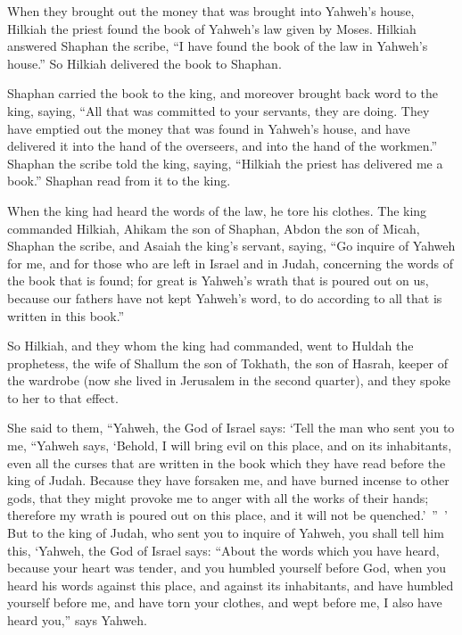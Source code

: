 {\par }{\PP {}When they brought out the money that was brought into Yahweh’s house, Hilkiah the priest found the book of Yahweh’s law given by Moses.
Hilkiah answered Shaphan the scribe, “I have found the book of the law in Yahweh’s house.” So Hilkiah delivered the book to Shaphan.
\par }{\PP {}Shaphan carried the book to the king, and moreover brought back word to the king, saying, “All that was committed to your servants, they are doing.
They have emptied out the money that was found in Yahweh’s house, and have delivered it into the hand of the overseers, and into the hand of the workmen.”
Shaphan the scribe told the king, saying, “Hilkiah the priest has delivered me a book.” Shaphan read from it to the king.
\par }{\PP {}When the king had heard the words of the law, he tore his clothes.
The king commanded Hilkiah, Ahikam the son of Shaphan, Abdon the son of Micah, Shaphan the scribe, and Asaiah the king’s servant, saying,
“Go inquire of Yahweh for me, and for those who are left in Israel and in Judah, concerning the words of the book that is found; for great is Yahweh’s wrath that is poured out on us, because our fathers have not kept Yahweh’s word, to do according to all that is written in this book.”
\par }{\PP {}So Hilkiah, and they whom the king had commanded, went to Huldah the prophetess, the wife of Shallum the son of Tokhath, the son of Hasrah, keeper of the wardrobe (now she lived in Jerusalem in the second quarter), and they spoke to her to that effect.
\par }{\PP {}She said to them, “Yahweh, the God of Israel says: ‘Tell the man who sent you to me,
“Yahweh says, ‘Behold, I will bring evil on this place, and on its inhabitants, even all the curses that are written in the book which they have read before the king of Judah.
Because they have forsaken me, and have burned incense to other gods, that they might provoke me to anger with all the works of their hands; therefore my wrath is poured out on this place, and it will not be quenched.’ ” ’
But to the king of Judah, who sent you to inquire of Yahweh, you shall tell him this, ‘Yahweh, the God of Israel says: “About the words which you have heard,
because your heart was tender, and you humbled yourself before God, when you heard his words against this place, and against its inhabitants, and have humbled yourself before me, and have torn your clothes, and wept before me, I also have heard you,” says Yahweh.
}
